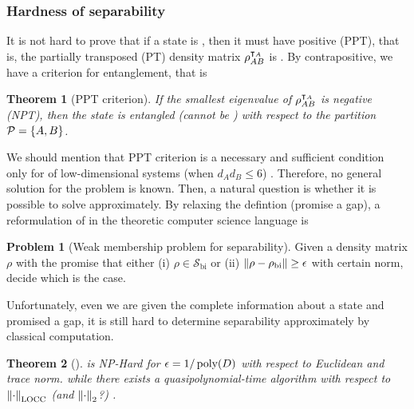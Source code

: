 \documentclass[
aps,
pra,
twocolumn,
floatfix,
]{revtex4-2}
\theoremstyle{plain}
\newtheorem{theorem}{Theorem}
\theoremstyle{definition}
\newtheorem{problem}{Problem}
\newcommand{\dm}{\rho}
\newcommand{\bi}{\text{bi}}
\newcommand{\ppt}{\textup{PPT}}
\newcommand{\locc}{\textup{LOCC}}
\newcommand{\separable}{\mathcal{S}}
\newcommand{\ppartition}{\mathcal{P}}
\begin{document}
\subsubsection{Hardness of separability}
It is not hard to prove that if a state is , then it must have positive  (PPT), 
that is, the partially transposed (PT) density matrix $\dm_{AB}^{\T_A}$ is  \cite{peresSeparabilityCriterionDensity1996}.
By contrapositive, we have a criterion for entanglement, that is
\begin{theorem}[PPT criterion]\label{thm:ppt}
	If the smallest eigenvalue of  $\dm_{AB}^{\T_A}$ is negative (NPT), then the state is entangled (cannot be ) with respect to the partition $\ppartition=\qty{A,B}$.
\end{theorem}
We should mention that PPT criterion is a necessary and sufficient condition only for  of low-dimensional systems 
(when $d_A d_B \le 6$) \cite{horodeckiSeparabilityMixedStates1996}.
Therefore, no general solution for the  problem is known.
Then, a natural question is whether it is possible to solve  approximately.
By relaxing the defintion (promise a gap), a reformulation of  in the theoretic computer science language is
\begin{problem}[Weak membership problem for separability]\label{prm:weak_membership problem_for_separability}
	Given a density matrix $\dm$ with the promise that either (i) $\dm\in \separable_{\bi}$ or (ii) $\norm{\dm-\dm_{\bi}}\ge \epsilon$ with certain norm, decide which is the case.
\end{problem}
Unfortunately, even we are given the complete information about a state and promised a gap, it is still hard to determine separability approximately by classical computation.
\begin{theorem}[\cite{gurvitsClassicalDeterministicComplexity2003}]
	 is NP-Hard for $\epsilon=1/\operatorname{\textup{poly}}(D)$ with respect to Euclidean  and trace norm.
	\cite{ioannouComputationalComplexityQuantum2007}
	\cite{dohertyCompleteFamilySeparability2004}
	while there exists a quasipolynomial-time algorithm with respect to $\norm{\cdot}_{\locc}$ (and $\norm{\cdot}_2$?) \cite{brandaoQuasipolynomialtimeAlgorithmQuantum2011}.
	\label{thm:classical_hardness}
\end{theorem}
\end{document}
